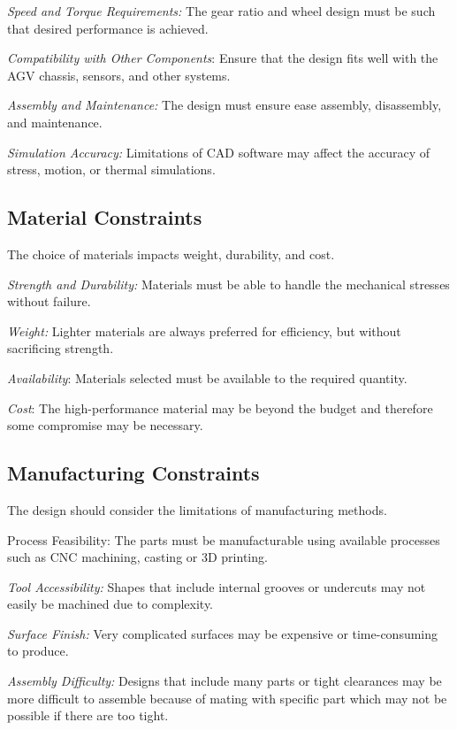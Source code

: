 \documentclass[../../main]{subfiles}
\begin{document}
\emph{Speed and Torque Requirements:} The gear ratio and wheel design
must be such that desired performance is achieved.

\emph{Compatibility with Other Components}: Ensure that the design fits
well with the AGV chassis, sensors, and other systems.

\emph{Assembly and Maintenance:} The design must ensure ease assembly,
disassembly, and maintenance.

\emph{Simulation Accuracy:} Limitations of CAD software may affect the
accuracy of stress, motion, or thermal simulations.

\subsection{Material Constraints}

The choice of materials impacts weight, durability, and cost.

\emph{Strength and Durability:} Materials must be able to handle the
mechanical stresses without failure.

\emph{Weight:} Lighter materials are always preferred for efficiency,
but without sacrificing strength.

\emph{Availability}: Materials selected must be available to the
required quantity.

\emph{Cost}: The high-performance material may be beyond the budget and
therefore some compromise may be necessary.

\subsection{Manufacturing Constraints}

The design should consider the limitations of manufacturing methods.

Process Feasibility: The parts must be manufacturable using available
processes such as CNC machining, casting or 3D printing.

\emph{Tool Accessibility:} Shapes that include internal grooves or
undercuts may not easily be machined due to complexity.

\emph{Surface Finish:} Very complicated surfaces may be expensive or
time-consuming to produce.

\emph{Assembly Difficulty:} Designs that include many parts or tight
clearances may be more difficult to assemble because of mating with
specific part which may not be possible if there are too tight.
\end{document}
